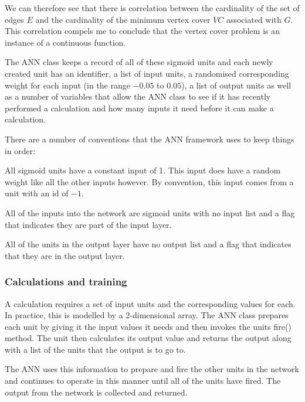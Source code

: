\documentclass[11pt]{article}
\theoremstyle{definition}
\begin{document}
      We can therefore see that there is correlation between the cardinality of the set of edges $E$ and
      the cardinality of the minimum vertex cover $VC$ associated with $G$. This correlation compels
      me to conclude that the vertex cover problem is an instance of a continuous function.  

      The ANN class keeps a record of all of these sigmoid units and each newly created unit has an
      identifier, a list
      of input units, a randomised corresponding weight for each input (in the range $-0.05$ to $0.05$), a
      list of output units as well as a number of variables that allow the ANN class to see if it has 
      recently performed a calculation and how many inputs it need before it can make a calculation.

      There are a number of conventions that the ANN framework uses to keep things in order:
      \begin{itemize*}
        \item All sigmoid units have a constant input of 1. This input does have a random weight like all
              the other inputs however. By convention, this input comes from a unit with an id of $-1$.
        \item All of the inputs into the network are sigmoid units with no input list and a flag that
              indicates they are part of the input layer.
        \item All of the units in the output layer have no output list and a flag that indicates that
              they are in the output layer.
      \end{itemize*}
   

      \subsubsection{Calculations and training}

        A calculation requires a set of input units and the corresponding values for each.
        In practice, this is modelled by a 2-dimensional array. The ANN class prepares each unit
        by giving it the input values it needs and then invokes the units fire() method. The
        unit then calculates its output value and returns the output along with a list of the
        units that the output is to go to.

        The ANN uses this information to prepare and fire the other units in the network and
        continues to operate in this manner until all of the units have fired. The output from
        the network is collected and returned.
          
\end{document}
